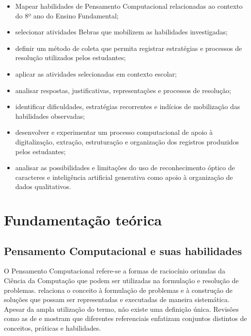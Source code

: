 \begin{itemize}
    \item Mapear habilidades de Pensamento Computacional relacionadas ao contexto do 8º ano do Ensino Fundamental;
    \item selecionar atividades Bebras que mobilizem as habilidades investigadas;
    \item definir um método de coleta que permita registrar estratégias e processos de resolução utilizados pelos estudantes;
    \item aplicar as atividades selecionadas em contexto escolar;
    \item analisar respostas, justificativas, representações e processos de resolução;
    \item identificar dificuldades, estratégias recorrentes e indícios de mobilização das habilidades observadas;
    \item desenvolver e experimentar um processo computacional de apoio à digitalização, extração, estruturação e organização dos registros produzidos pelos estudantes;
    \item analisar as possibilidades e limitações do uso de reconhecimento óptico de caracteres e inteligência artificial generativa como apoio à organização de dados qualitativos.

\end{itemize}


\section{Fundamentação teórica}
\label{sec:fundamentacao}

\subsection{Pensamento Computacional e suas habilidades}

O Pensamento Computacional refere-se a formas de raciocínio oriundas da Ciência da Computação que podem ser utilizadas na formulação e resolução de problemas.  relaciona o conceito à formulação de problemas e à construção de soluções que possam ser representadas e executadas de maneira sistemática. Apesar da ampla utilização do termo, não existe uma definição única. Revisões como as de  e  mostram que diferentes referenciais enfatizam conjuntos distintos de conceitos, práticas e habilidades.

